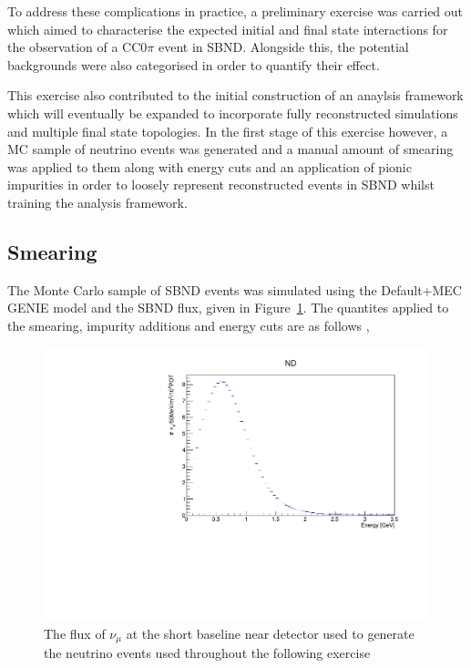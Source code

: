 To address these complications in practice, a preliminary exercise was carried out which aimed to characterise the expected initial and final state interactions for the observation of a CC0\(\pi\) event in SBND. Alongside this, the potential backgrounds were also categorised in order to quantify their effect. 

    This exercise also contributed to the initial construction of an anaylsis framework which will eventually be expanded to incorporate fully reconstructed simulations and multiple final state topologies. In the first stage of this exercise however, a MC sample of neutrino events was generated and a manual amount of smearing was applied to them along with energy cuts and an application of pionic impurities in order to loosely represent reconstructed events in SBND whilst training the analysis framework.  

\subsection{Smearing}

The Monte Carlo sample of SBND events was simulated using the Default+MEC GENIE model and the SBND flux, given in Figure~\ref{fig:SBNDFlux}. The quantites applied to the smearing, impurity additions and energy cuts are as follows \footnotemark,


    \begin{figure}[h!]
        \centering
        \includegraphics[width=.8\textwidth, trim=0 0 0 1cm, clip]{images/sbnd_flux.pdf}
        \caption{The flux of \(\nu_{\mu}\) at the short baseline near detector used to generate the neutrino events used throughout the following exercise}
        \label{fig:SBNDFlux}
    \end{figure}

